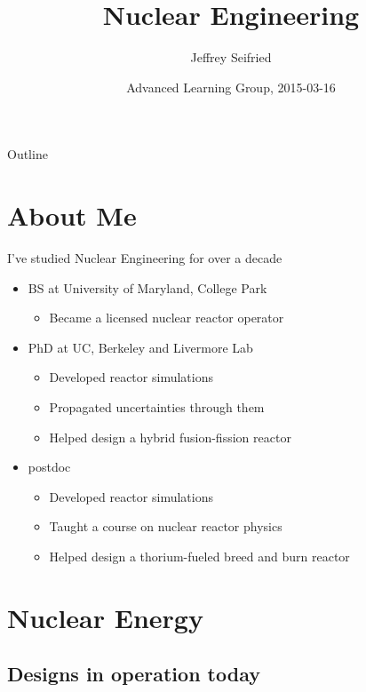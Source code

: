\documentclass{beamer}
\title{Nuclear Engineering}
\author{Jeffrey Seifried}
\institute{Ad Delivery Team, Yelp}
\date{Advanced Learning Group, 2015-03-16 }
\begin{document}
\begin{frame}
  \titlepage
\end{frame}

\begin{frame}{Outline}
  \tableofcontents
\end{frame}


\section{About Me}

    \begin{frame}{I've studied Nuclear Engineering for over a decade}

        \begin{itemize}
            \item BS at University of Maryland, College Park
            \begin{itemize}
                \item Became a licensed nuclear reactor operator
            \end{itemize}
            \item PhD at UC, Berkeley and Livermore Lab
            \begin{itemize}
                \item Developed reactor simulations
                \item Propagated uncertainties through them
                \item Helped design a hybrid fusion-fission reactor
            \end{itemize}
            \item postdoc
            \begin{itemize}
                \item Developed reactor simulations
                \item Taught a course on nuclear reactor physics
                \item Helped design a thorium-fueled breed and burn reactor
            \end{itemize}
        \end{itemize}

    \end{frame}

\section{Nuclear Energy}

\subsection{Designs in operation today}
\end{document}
